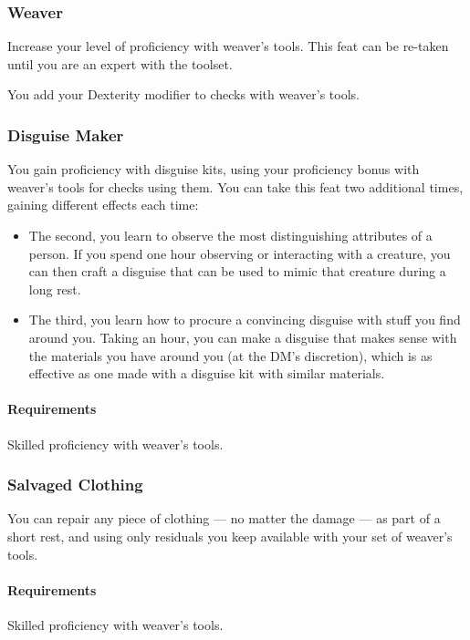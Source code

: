     \subsubsection{Weaver} \label{feat::weaver}
        Increase your level of proficiency with weaver's tools.
        This feat can be re-taken until you are an expert with the toolset.

        You add your Dexterity modifier to checks with weaver's tools.
    \subsubsection{Disguise Maker} \label{feat::disguisemaker}
        You gain proficiency with disguise kits, using your proficiency bonus with weaver's tools for checks using them.
        You can take this feat two additional times, gaining different effects each time:
        \begin{itemize}
            \item The second, you learn to observe the most distinguishing attributes of a person.
            If you spend one hour observing or interacting with a creature, you can then craft a disguise that can be used to mimic that creature during a long rest.
            \item The third, you learn how to procure a convincing disguise with stuff you find around you.
            Taking an hour, you can make a disguise that makes sense with the materials you have around you (at the DM's discretion), which is as effective as one made with a disguise kit with similar materials.
        \end{itemize}
        \paragraph{Requirements} Skilled proficiency with weaver's tools.
    \subsubsection{Salvaged Clothing} \label{feat::salvagedclothing}
        You can repair any piece of clothing --- no matter the damage --- as part of a short rest, and using only residuals you keep available with your set of weaver's tools.
        \paragraph{Requirements} Skilled proficiency with weaver's tools.
